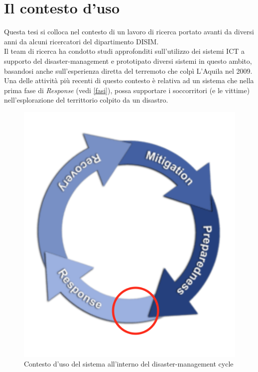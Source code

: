 \section{Il contesto d'uso}
\label{contesto}
Questa tesi si colloca nel contesto di un lavoro di ricerca portato avanti da diversi anni da alcuni ricercatori del dipartimento DISIM.\\
Il team di ricerca ha condotto studi approfonditi sull'utilizzo dei sistemi ICT a supporto del disaster-management e prototipato diversi sistemi in questo ambito, basandosi anche sull'esperienza diretta del terremoto che colpì L'Aquila nel 2009.\\
Una delle attività più recenti di questo contesto è relativa ad un sistema che nella prima fase di \textit{Response} (vedi \ref{fasi}), possa supportare i  soccorritori (e le vittime) nell'esplorazione del territtorio colpito da un disastro. \\
\begin{figure}[H]
	\centering
	\includegraphics[scale=0.8]{ScenarioApplicativo/contesto.png}
	\caption{Contesto d'uso del sistema all'interno del disaster-management cycle}
	\label{fig:contesto}
\end{figure}
